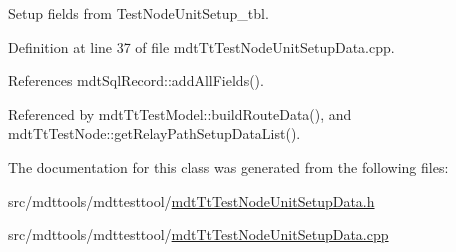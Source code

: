 Setup fields from Test\-Node\-Unit\-Setup\-\_\-tbl. 



Definition at line 37 of file mdt\-Tt\-Test\-Node\-Unit\-Setup\-Data.\-cpp.



References mdt\-Sql\-Record\-::add\-All\-Fields().



Referenced by mdt\-Tt\-Test\-Model\-::build\-Route\-Data(), and mdt\-Tt\-Test\-Node\-::get\-Relay\-Path\-Setup\-Data\-List().



The documentation for this class was generated from the following files\-:\begin{DoxyCompactItemize}
\item 
src/mdttools/mdttesttool/\hyperlink{mdt_tt_test_node_unit_setup_data_8h}{mdt\-Tt\-Test\-Node\-Unit\-Setup\-Data.\-h}\item 
src/mdttools/mdttesttool/\hyperlink{mdt_tt_test_node_unit_setup_data_8cpp}{mdt\-Tt\-Test\-Node\-Unit\-Setup\-Data.\-cpp}\end{DoxyCompactItemize}
